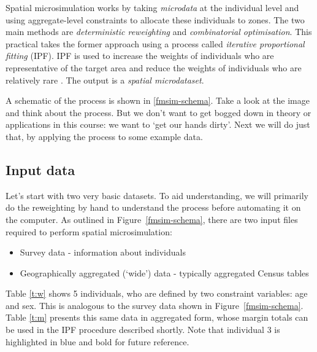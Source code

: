 \documentclass[a4paper, 11pt, twoside]{article}
\begin{document}
Spatial microsimulation works by taking \emph{microdata} at the individual level
and using aggregate-level constraints to allocate these individuals to zones.
The two main methods are \emph{deterministic reweighting} and \emph{combinatorial optimisation}.
This practical takes the former approach using a process called \emph{iterative proportional fitting}
(IPF). IPF is used to increase the weights of individuals who are representative
of the target area and reduce the weights of individuals who are relatively
rare \citep{Lovelace2013-trs}.
The output is a \emph{spatial microdataset}.

A schematic of the process is shown in \cref{fmsim-schema}.
Take a look at the image and think about the process. But we don't want to get
bogged down in theory or applications in this course: we want to `get our
hands dirty'. Next we will do just that, by applying the process to some
example data.

\subsection{Input data} \label{s:theory}

Let's start with two very basic datasets. To aid understanding, we will primarily do
the reweighting by hand to understand the process before automating it on the computer.
As outlined in Figure~\ref{fmsim-schema},
there are two input files required to perform spatial microsimulation:
\begin{itemize}
  \item Survey data - information about individuals
  \item Geographically aggregated (`wide') data - typically aggregated Census tables
\end{itemize}

Table \ref{t:w} shows 5 individuals, who are defined by two constraint variables:
age and sex. This is analogous to the survey data shown in Figure~\ref{fmsim-schema}.
Table \ref{t:m} presents this same data in aggregated form, whose margin totals can
be used in the IPF procedure described shortly. Note that individual 3 is highlighted in
blue and bold for future reference.
\end{document}
